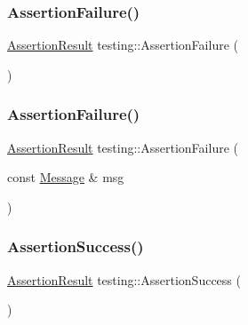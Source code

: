 \mbox{\label{namespacetesting_a75cb789614cb1c28c34627a4a3c053df}} 
\subsubsection{\texorpdfstring{Assertion\+Failure()}{AssertionFailure()}\hspace{0.1cm}{\footnotesize\ttfamily [1/2]}}
{\footnotesize\ttfamily \hyperlink{classtesting_1_1_assertion_result}{Assertion\+Result} testing\+::\+Assertion\+Failure (\begin{DoxyParamCaption}{ }\end{DoxyParamCaption})}

\mbox{\label{namespacetesting_a6bdf82adf159dcda822d75746937ffa9}} 
\subsubsection{\texorpdfstring{Assertion\+Failure()}{AssertionFailure()}\hspace{0.1cm}{\footnotesize\ttfamily [2/2]}}
{\footnotesize\ttfamily \hyperlink{classtesting_1_1_assertion_result}{Assertion\+Result} testing\+::\+Assertion\+Failure (\begin{DoxyParamCaption}\item[{const \hyperlink{classtesting_1_1_message}{Message} \&}]{msg }\end{DoxyParamCaption})}

\mbox{\label{namespacetesting_ac1d0baedb17286c5c6c87bd1a45da8ac}} 
\subsubsection{\texorpdfstring{Assertion\+Success()}{AssertionSuccess()}}
{\footnotesize\ttfamily \hyperlink{classtesting_1_1_assertion_result}{Assertion\+Result} testing\+::\+Assertion\+Success (\begin{DoxyParamCaption}{ }\end{DoxyParamCaption})}

